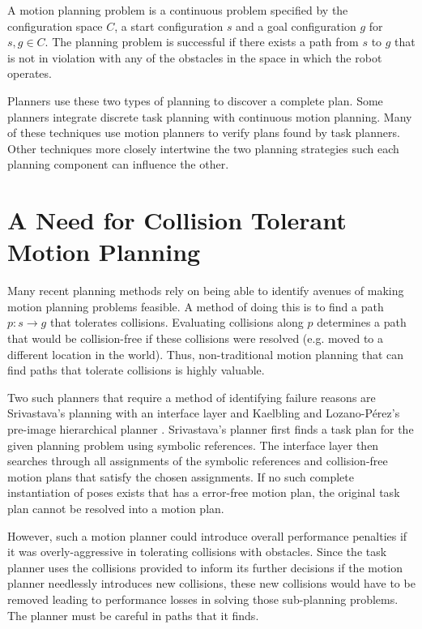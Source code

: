 A motion planning problem is a continuous problem specified by the configuration space $C$, a start configuration $s$ and a goal configuration $g$ for $s,g \in C$. The planning problem is successful if there exists a path from $s$ to $g$ that is not in violation with any of the obstacles in the space in which the robot operates.  

Planners use these two types of planning to discover a complete plan. Some planners integrate discrete task planning with continuous motion planning. Many of these techniques use motion planners to verify plans found by task planners. Other techniques more closely intertwine the two planning strategies such each planning component can influence the other. 

\section{A Need for Collision Tolerant Motion Planning} \label{intro:collisiontolerant}
Many recent planning methods rely on being able to identify avenues of making motion planning problems feasible. A method of doing this is to find a path $p:s \rightarrow g$ that tolerates collisions. Evaluating collisions along $p$ determines a path that would be collision-free if these collisions were resolved (e.g. moved to a different location in the world). Thus, non-traditional motion planning that can find paths that tolerate collisions is highly valuable. 

Two such planners that require a method of identifying failure reasons are Srivastava's planning with an interface layer and Kaelbling and Lozano-P\'{e}rez's pre-image hierarchical planner  . Srivastava's planner first finds a task plan for the given planning problem using symbolic references. The interface layer then searches through all assignments of the symbolic references and collision-free motion plans that satisfy the chosen assignments. If no such complete instantiation of poses exists that has a error-free motion plan, the original task plan cannot be resolved into a motion plan. 

However, such a motion planner could introduce overall performance penalties if it was overly-aggressive in tolerating collisions with obstacles. Since the task planner uses the collisions provided to inform its further decisions if the motion planner needlessly introduces new collisions, these new collisions would have to be removed leading to performance losses in solving those sub-planning problems. The planner must be careful in paths that it finds.

